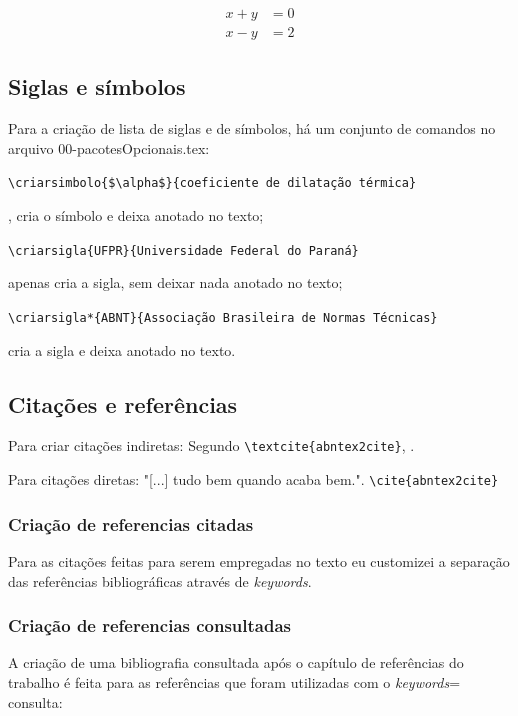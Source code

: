 \begin{align}
x + y &= 0\\
x - y &= 2 \label{eq:2}
\end{align}


\subsection[Acronimos]{Siglas e símbolos}

Para a criação de lista de siglas e de símbolos, há um conjunto de comandos no arquivo 00-pacotesOpcionais.tex:

\verb+\criarsimbolo{$\alpha$}{coeficiente de dilatação térmica}+ 

, cria o símbolo e deixa anotado no texto;

\verb+\criarsigla{UFPR}{Universidade Federal do Paraná}+ 

\label{item:UFPR} apenas cria a sigla, sem deixar nada anotado no texto;

\verb+\criarsigla*{ABNT}{Associação Brasileira de Normas Técnicas}+ 

 cria a sigla e deixa anotado no texto.

\subsection[Citações]{Citações e referências}

Para criar citações indiretas: Segundo \verb+\textcite{abntex2cite}+, \textcite{abntex2cite}.


Para citações diretas: "[...] tudo bem quando acaba bem."\cite{abntex2cite}. \verb+\cite{abntex2cite}+


\subsubsection{Criação de referencias citadas}

Para as citações feitas para serem empregadas no texto eu customizei a separação das referências bibliográficas através de \textit{keywords}.


\subsubsection{Criação de referencias consultadas}

A criação de uma bibliografia consultada após o capítulo de referências do trabalho é feita para as referências que foram utilizadas com o \textit{keywords}= {consulta}:

